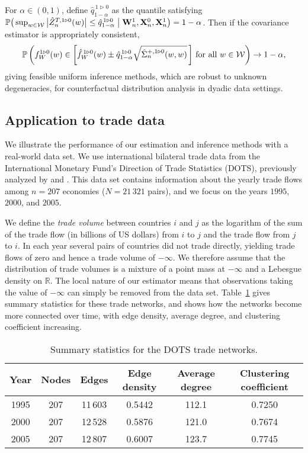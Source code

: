\documentclass[11pt,lof]{puthesis}
\renewcommand{\P}{\ensuremath{\mathbb{P}}}
\newcommand{\R}{\ensuremath{\mathbb{R}}}
\newcommand{\bW}{\ensuremath{\mathbf{W}}}
\newcommand{\bX}{\ensuremath{\mathbf{X}}}
\newcommand{\cW}{\ensuremath{\mathcal{W}}}
\theoremstyle{break}
\theoremstyle{proof}
\begin{document}
For $\alpha \in (0,1)$, define
$\hat q_{1-\alpha}^{\,1 \triangleright 0}$
as the quantile satisfying
$\P\big(\sup_{w \in \cW}\big| \hat Z_n^{T, 1 \triangleright 0}(w) \big|
\leq \hat q_{1-\alpha}^{\,1 \triangleright 0}
\bigm\vert \bW_n^1, \bX_n^0, \bX_n^1 \big)
= 1 - \alpha$.
Then if the covariance estimator is appropriately consistent,
%
\begin{align*}
\P\left(
f_W^{1 \triangleright 0}(w) \in
\left[
\hat f_W^{\,1 \triangleright 0}(w)
\pm \hat q^{\,1 \triangleright 0}_{1-\alpha}
\sqrt{\hat\Sigma_n^{+, 1 \triangleright 0}(w,w)}
\,\right]
\,\textup{for all } w \in \cW
\right) \to 1 - \alpha,
\end{align*}
%
giving feasible uniform inference methods, which are robust to unknown
degeneracies, for counterfactual distribution analysis in dyadic data settings.

\subsection{Application to trade data}
\label{sec:kernel_trade_data}

We illustrate the performance of our estimation and inference methods with a
real-world data set. We use international bilateral trade data from the
International Monetary Fund's Direction of Trade Statistics (DOTS), previously
analyzed by \citet{head2014gravity} and \citet{chiang2022inference}. This data
set contains information about the yearly trade flows among $n = 207$ economies
($N = 21\,321$ pairs), and we focus on the years $1995$, $2000$, and $2005$.

We define the \emph{trade volume} between countries $i$ and $j$ as the
logarithm of the sum of the trade flow (in billions of US dollars) from $i$ to
$j$ and the trade flow from $j$ to $i$. In each year several pairs of countries
did not trade directly, yielding trade flows of zero and hence a trade volume
of $-\infty$. We therefore assume that the distribution of trade volumes is a
mixture of a point mass at $-\infty$ and a Lebesgue density on $\R$. The local
nature of our estimator means that observations taking the value of $-\infty$
can simply be removed from the data set.
Table~\ref{tab:kernel_trade_network_stats}
gives summary statistics for these trade networks, and shows how the networks
become more connected over time, with edge density, average degree, and
clustering coefficient increasing.

\begin{table}[b!]
\centering
\begin{tabular}{|c|c|c|c|c|c|}
\hline
Year & Nodes & Edges & Edge density & Average degree
& Clustering coefficient \\
\hline
1995 & 207 & 11\,603 & 0.5442 & 112.1 & 0.7250 \\
2000 & 207 & 12\,528 & 0.5876 & 121.0 & 0.7674 \\
2005 & 207 & 12\,807 & 0.6007 & 123.7 & 0.7745 \\
\hline
\end{tabular}
\caption[Summary statistics for the DOTS trade networks]{
Summary statistics for the DOTS trade networks.}
\label{tab:kernel_trade_network_stats}
\end{table}
\end{document}
